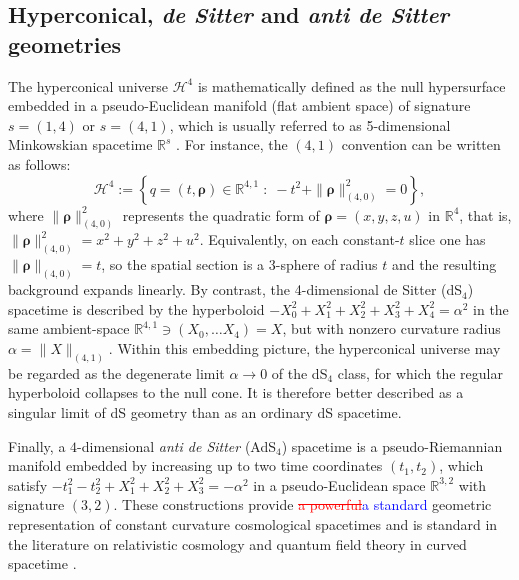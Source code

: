 \documentclass[3p,times,twocolumn]{elsarticle}
\renewcommand{\vec}[1]{\boldsymbol{#1}}
\begin{document}

\subsection{Hyperconical, \textit{de Sitter} and \textit{anti de Sitter} geometries}

The hyperconical universe $\mathcal{H}^4$ is mathematically defined as the null hypersurface embedded in a pseudo-Euclidean manifold (flat ambient space) of signature $s=(1,4)$ or $s=(4,1)$, which is usually referred to as 5-dimensional Minkowskian spacetime $\mathbb{R}^s$ \cite{monjo2017hyperconical, Monjo_2024}. For instance, the $(4,1)$ convention can be written as follows:
\begin{equation}
\mathcal{H}^4:=\left\{q=(t,\vec{\rho})\in\mathbb{R}^{4,1}\;:\;-t^2+\|\vec{\rho}\|_{\scriptscriptstyle{(4,0)}}^2=0\right\},
\end{equation}where $\|\vec{\rho}\|_{\scriptscriptstyle{(4,0)}} ^2$ represents the quadratic form of $\vec{\rho} = (x,y,z,u)$ in $\mathbb{R}^4$, that is, $\|\vec{\rho}\|_{\scriptscriptstyle{(4,0)}} ^2 = x^2+y^2+z^2+u^2$. Equivalently, on each constant-$t$ slice one has $\|\vec{\rho}\|_{\scriptscriptstyle{(4,0)}} =t$, so the spatial section is a 3-sphere of radius $t$ and the resulting background expands linearly. By contrast, the 4-dimensional de Sitter (dS${}_4$) spacetime is described by the hyperboloid $-X_0^2+X_1^2+X_2^2+X_3^2+X_4^2=\alpha^2$ in the same ambient-space $\mathbb{R}^{4,1} \ni (X_0, \dots X_4) = X$, but with nonzero curvature radius $\alpha = \|X\|_{\scriptscriptstyle{(4,1)}}$. Within this embedding picture, the hyperconical universe may be regarded as the degenerate limit $\alpha\to0$ of the dS${}_4$ class, for which the regular hyperboloid collapses to the null cone. It is therefore better described as a singular limit of dS geometry than as an ordinary dS spacetime.

Finally, a $4$-dimensional \textit{anti de Sitter} (AdS${}_4$) spacetime is a pseudo-Riemannian manifold embedded by increasing up to two time coordinates $(t_1, t_2)$, which satisfy $-t_1^2-t_2^2+X_1^2+X_2^2+X_3^2 = -\alpha^2$ in a pseudo-Euclidean space $\mathbb{R}^{3,2}$ with signature $(3,2)$.  These constructions provide \textcolor{red}{\sout{a powerful}}\textcolor{blue}{a standard} geometric representation of constant curvature cosmological spacetimes and is standard in the literature on relativistic cosmology and quantum field theory in curved spacetime \cite{hawking1973large, spradlin2001les}.
\end{document}

